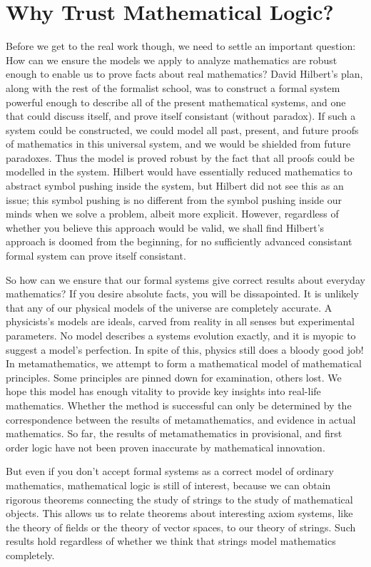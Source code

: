 \section{Why Trust Mathematical Logic?}

Before we get to the real work though, we need to settle an important question: How can we ensure the models we apply to analyze mathematics are robust enough to enable us to prove facts about real mathematics? David Hilbert's plan, along with the rest of the formalist school, was to construct a formal system powerful enough to describe all of the present mathematical systems, and one that could discuss itself, and prove itself consistant (without paradox). If such a system could be constructed, we could model all past, present, and future proofs of mathematics in this universal system, and we would be shielded from future paradoxes. Thus the model is proved robust by the fact that all proofs could be modelled in the system. Hilbert would have essentially reduced mathematics to abstract symbol pushing inside the system, but Hilbert did not see this as an issue; this symbol pushing is no different from the symbol pushing inside our minds when we solve a problem, albeit more explicit. However, regardless of whether you believe this approach would be valid, we shall find Hilbert's approach is doomed from the beginning, for no sufficiently advanced consistant formal system can prove itself consistant.

So how can we ensure that our formal systems give correct results about everyday mathematics? If you desire absolute facts, you will be dissapointed. It is unlikely that any of our physical models of the universe are completely accurate. A physicists's models are ideals, carved from reality in all senses but experimental parameters. No model describes a systems evolution exactly, and it is myopic to suggest a model's perfection. In spite of this, physics still does a bloody good job! In metamathematics, we attempt to form a mathematical model of mathematical principles. Some principles are pinned down for examination, others lost. We hope this model has enough vitality to provide key insights into real-life mathematics. Whether the method is successful can only be determined by the correspondence between the results of metamathematics, and evidence in actual mathematics. So far, the results of metamathematics in provisional, and first order logic have not been proven inaccurate by mathematical innovation.

But even if you don't accept formal systems as a correct model of ordinary mathematics, mathematical logic is still of interest, because we can obtain rigorous theorems connecting the study of strings to the study of mathematical objects. This allows us to relate theorems about interesting axiom systems, like the theory of fields or the theory of vector spaces, to our theory of strings. Such results hold regardless of whether we think that strings model mathematics completely.

